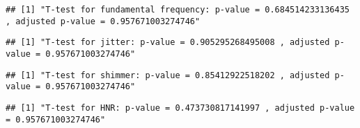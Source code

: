\documentclass[
]{article}
\newenvironment{Shaded}{\begin{snugshade}}{\end{snugshade}}
\newcommand{\DecValTok}[1]{\textcolor[rgb]{0.00,0.00,0.81}{#1}}
\newcommand{\FunctionTok}[1]{\textcolor[rgb]{0.00,0.00,0.00}{#1}}
\newcommand{\NormalTok}[1]{#1}
\newcommand{\SpecialCharTok}[1]{\textcolor[rgb]{0.00,0.00,0.00}{#1}}
\newcommand{\StringTok}[1]{\textcolor[rgb]{0.31,0.60,0.02}{#1}}
\begin{document}
\begin{verbatim}
## [1] "T-test for fundamental frequency: p-value = 0.684514233136435 , adjusted p-value = 0.957671003274746"
\end{verbatim}

\begin{Shaded}
\end{Shaded}

\begin{verbatim}
## [1] "T-test for jitter: p-value = 0.905295268495008 , adjusted p-value = 0.957671003274746"
\end{verbatim}

\begin{Shaded}
\end{Shaded}

\begin{verbatim}
## [1] "T-test for shimmer: p-value = 0.85412922518202 , adjusted p-value = 0.957671003274746"
\end{verbatim}

\begin{Shaded}
\end{Shaded}

\begin{verbatim}
## [1] "T-test for HNR: p-value = 0.473730817141997 , adjusted p-value = 0.957671003274746"
\end{verbatim}
\end{document}
